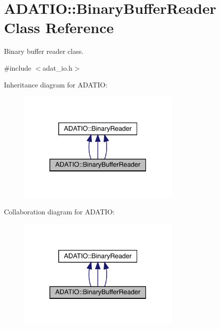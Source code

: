 \hypertarget{classADATIO_1_1BinaryBufferReader}{}\section{A\+D\+A\+T\+IO\+:\+:Binary\+Buffer\+Reader Class Reference}
\label{classADATIO_1_1BinaryBufferReader}


Binary buffer reader class.  




{\ttfamily \#include $<$adat\+\_\+io.\+h$>$}



Inheritance diagram for A\+D\+A\+T\+IO\+:
\nopagebreak
\begin{figure}[H]
\begin{center}
\leavevmode
\includegraphics[width=226pt]{d5/d74/classADATIO_1_1BinaryBufferReader__inherit__graph}
\end{center}
\end{figure}


Collaboration diagram for A\+D\+A\+T\+IO\+:
\nopagebreak
\begin{figure}[H]
\begin{center}
\leavevmode
\includegraphics[width=226pt]{da/db1/classADATIO_1_1BinaryBufferReader__coll__graph}
\end{center}
\end{figure}
